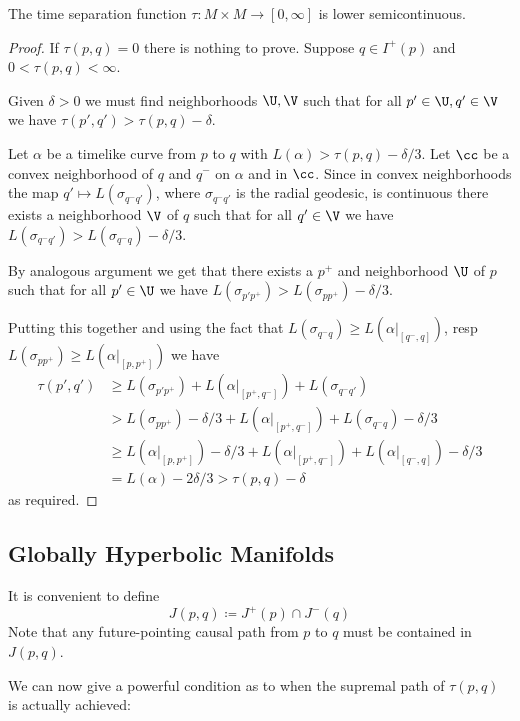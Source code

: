 \begin{lemma}
The time separation function $\tau:M\times M \to [0,\infty]$ is lower semicontinuous.
\end{lemma}
\begin{proof}
If $\tau(p,q)=0$ there is nothing to prove. Suppose $q\in I^+(p)$ and $0<\tau(p,q)<\infty$.

Given $\delta>0$ we must find neighborhoods $\U,\V$ such that for all $p'\in\U, q'\in\V$ we have $\tau(p',q') > \tau(p,q) - \delta$.

Let $\alpha$ be a timelike curve from $p$ to $q$ with $L(\alpha)>\tau(p,q)-\delta/3$. Let $\cc$ be a convex neighborhood of $q$ and $q^-$ on $\alpha$ and in $\cc$. Since in convex neighborhoods the map $q'\mapsto L(\sigma_{q^-q'})$, where $\sigma_{q^-q'}$ is the radial geodesic, is continuous there exists a neighborhood $\V$ of $q$ such that for all $q'\in \V$ we have $L(\sigma_{q^-q'})>L(\sigma_{q^-q})-\delta/3$.

By analogous argument we get that there exists a $p^+$ and neighborhood $\U$ of $p$ such that for all $p'\in \U$ we have $L(\sigma_{p'p^+})>L(\sigma_{pp^+})-\delta/3$.

Putting this together and using the fact that $L(\sigma_{q^-q})\ge L(\alpha\rvert_{[q^-,q]})$, resp $L(\sigma_{pp^+})\ge L(\alpha\rvert_{[p,p^+]})$ we have 
\begin{align*}
\tau(p',q') &\ge L(\sigma_{p'p^+})+L(\alpha\rvert_{\left[p^+,q^-\right]})+L(\sigma_{q^-q'}) \\
&>L(\sigma_{pp^+}) -\delta/3 + L(\alpha\rvert_{\left[p^+,q^-\right]}) + L(\sigma_{q^-q}) - \delta/3 \\
&\ge L(\alpha\rvert_{[p,p^+]}) -\delta/3 + L(\alpha\rvert_{\left[p^+,q^-\right]}) + L(\alpha\rvert_{[q^-,q]}) - \delta/3\\ 
&= L(\alpha) - 2\delta/3 > \tau(p,q) - \delta
\end{align*}
as required.
\end{proof}

\subsection{Globally Hyperbolic Manifolds}
It is convenient to define 
\[
J(p,q) \coloneqq J^+(p) \cap J^-(q)
\]
Note that any future-pointing causal path from $p$ to $q$ must be contained in $J(p,q)$.

We can now give a powerful condition as to when the supremal path of $\tau(p,q)$ is actually achieved:

